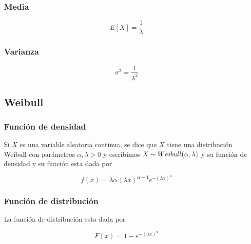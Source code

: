 \documentclass{article}
\begin{document}
            \subsubsection{Media}

                \begin{equation*}
                    E[X] = \frac{1}{\lambda}
                \end{equation*}
                
            \subsubsection{Varianza}

                \begin{equation*}
                    \sigma ^2 = \frac{1}{\lambda ^2}
                \end{equation*}
            

        \subsection{Weibull}

            \subsubsection{Función de densidad}

                Si $X$ es una variable aleatoria continua, se dice que $X$ tiene una distribución Weibull con parámetros $\alpha, \lambda >0$ y escribimos $X\thicksim Weibull(\alpha, \lambda)$ y su función de densidad y su función esta dada por

                    \begin{equation*}
                        f(x)= \lambda \alpha (\lambda x)^{\alpha -1} e^{-(\lambda x)^\alpha}
                    \end{equation*}

            \subsubsection{Función de distribución}

                La función de distribución esta dada por

                    \begin{equation*}
                        F(x) = 1-e^{-(\lambda x)^{\alpha}}
                    \end{equation*}
\end{document}
